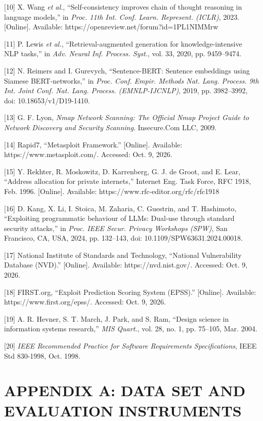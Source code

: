 \documentclass[
]{article}
\begin{document}
{[}10{]} X. Wang \emph{et al.}, ``Self-consistency improves chain of
thought reasoning in language models,'' in \emph{Proc. 11th Int. Conf.
Learn. Represent. (ICLR)}, 2023. {[}Online{]}. Available:
https://openreview.net/forum?id=1PL1NIMMrw

{[}11{]} P. Lewis \emph{et al.}, ``Retrieval-augmented generation for
knowledge-intensive NLP tasks,'' in \emph{Adv. Neural Inf. Process.
Syst.}, vol. 33, 2020, pp. 9459--9474.

{[}12{]} N. Reimers and I. Gurevych, ``Sentence-BERT: Sentence
embeddings using Siamese BERT-networks,'' in \emph{Proc. Conf. Empir.
Methods Nat. Lang. Process. 9th Int. Joint Conf. Nat. Lang. Process.
(EMNLP-IJCNLP)}, 2019, pp. 3982--3992, doi: 10.18653/v1/D19-1410.

{[}13{]} G. F. Lyon, \emph{Nmap Network Scanning: The Official Nmap
Project Guide to Network Discovery and Security Scanning}. Insecure.Com
LLC, 2009.

{[}14{]} Rapid7, ``Metasploit Framework.'' {[}Online{]}. Available:
https://www.metasploit.com/. Accessed: Oct. 9, 2026.

{[}15{]} Y. Rekhter, R. Moskowitz, D. Karrenberg, G. J. de Groot, and E.
Lear, ``Address allocation for private internets,'' Internet Eng. Task
Force, RFC 1918, Feb. 1996. {[}Online{]}. Available:
https://www.rfc-editor.org/rfc/rfc1918

{[}16{]} D. Kang, X. Li, I. Stoica, M. Zaharia, C. Guestrin, and T.
Hashimoto, ``Exploiting programmatic behaviour of LLMs: Dual-use through
standard security attacks,'' in \emph{Proc. IEEE Secur. Privacy
Workshops (SPW)}, San Francisco, CA, USA, 2024, pp. 132--143, doi:
10.1109/SPW63631.2024.00018.

{[}17{]} National Institute of Standards and Technology, ``National
Vulnerability Database (NVD).'' {[}Online{]}. Available:
https://nvd.nist.gov/. Accessed: Oct. 9, 2026.

{[}18{]} FIRST.org, ``Exploit Prediction Scoring System (EPSS).''
{[}Online{]}. Available: https://www.first.org/epss/. Accessed: Oct. 9,
2026.

{[}19{]} A. R. Hevner, S. T. March, J. Park, and S. Ram, ``Design
science in information systems research,'' \emph{MIS Quart.}, vol. 28,
no. 1, pp. 75--105, Mar. 2004.

{[}20{]} \emph{IEEE Recommended Practice for Software Requirements
Specifications}, IEEE Std 830-1998, Oct. 1998.

\hypertarget{appendix-a-data-set-and-evaluation-instruments}{%
\section{APPENDIX A: DATA SET AND EVALUATION
INSTRUMENTS}\label{appendix-a-data-set-and-evaluation-instruments}}
\end{document}
